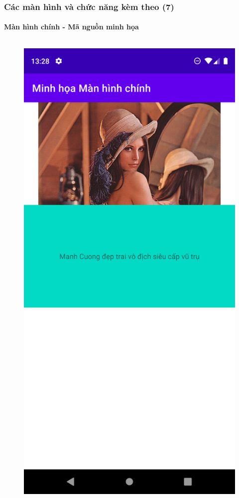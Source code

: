 \documentclass{beamer}
\begin{document}
\begin{frame}
    \frametitle{Các màn hình và chức năng kèm theo (7)}
    \framesubtitle{Màn hình chính - Mã nguồn minh họa}

    \begin{columns}
        \begin{figure}
            \centering
            \includegraphics[height=0.7\textheight]{images/10.png}

\end{figure}
\end{columns}
\end{frame}
\end{document}
